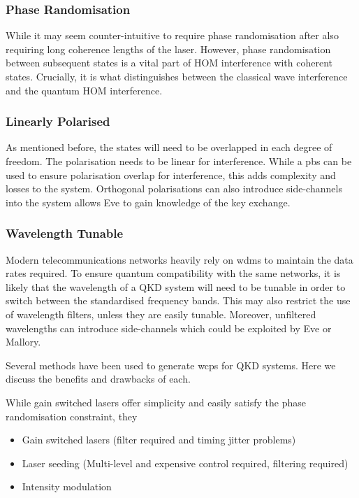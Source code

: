 \subsubsection*{Phase Randomisation}

While it may seem counter-intuitive to require phase randomisation after also requiring long coherence lengths of the laser. However, phase randomisation between subsequent states is a vital part of \ac{HOM} interference with coherent states. Crucially, it is what distinguishes between the classical wave interference and the quantum \ac{HOM} interference.

\subsubsection*{Linearly Polarised}

As mentioned before, the states will need to be overlapped in each degree of freedom. The polarisation needs to be linear for interference. While a \ac{pbs} can be used to ensure polarisation overlap for interference, this adds complexity and losses to the system. Orthogonal polarisations can also introduce side-channels into the system allows Eve to gain knowledge of the key exchange.

\subsubsection*{Wavelength Tunable}

Modern telecommunications networks heavily rely on \acp{wdm} to maintain the data rates required. To ensure quantum compatibility with the same networks, it is likely that the wavelength of a \ac{QKD} system will need to be tunable in order to switch between the standardised frequency bands. This may also restrict the use of wavelength filters, unless they are easily tunable. Moreover, unfiltered wavelengths can introduce side-channels which could be exploited by Eve or Mallory.

Several methods have been used to generate \acp{wcp} for \ac{QKD} systems. Here we discuss the benefits and drawbacks of each.

While gain switched lasers offer simplicity and easily satisfy the phase randomisation constraint, they  

\begin{itemize}
	\item Gain switched lasers (filter required and timing jitter problems)
	\item Laser seeding	(Multi-level and expensive control required, filtering required)
	\item Intensity modulation
\end{itemize}

